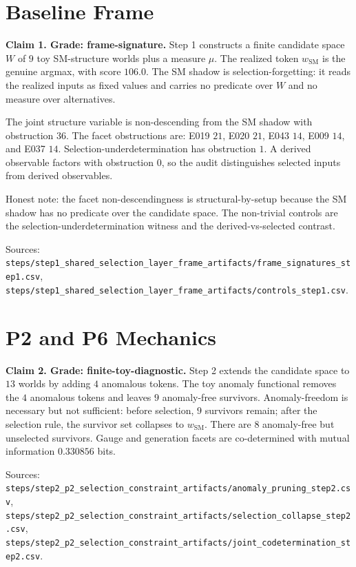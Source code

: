 \documentclass[11pt]{article}
\begin{document}
\section{Baseline Frame}

\textbf{Claim 1. Grade: frame-signature.}
Step 1 constructs a finite candidate space \(W\) of \(9\) toy SM-structure worlds plus a measure \(\mu\). The realized token \(w_{\mathrm{SM}}\) is the genuine argmax, with score \(106.0\). The SM shadow is selection-forgetting: it reads the realized inputs as fixed values and carries no predicate over \(W\) and no measure over alternatives.

The joint structure variable is non-descending from the SM shadow with obstruction \(36\). The facet obstructions are: E019 \(21\), E020 \(21\), E043 \(14\), E009 \(14\), and E037 \(14\). Selection-underdetermination has obstruction \(1\). A derived observable factors with obstruction \(0\), so the audit distinguishes selected inputs from derived observables.

Honest note: the facet non-descendingness is structural-by-setup because the SM shadow has no predicate over the candidate space. The non-trivial controls are the selection-underdetermination witness and the derived-vs-selected contrast.

Sources: \texttt{steps/step1\_shared\_selection\_layer\_frame\_artifacts/frame\_signatures\_step1.csv}, \texttt{steps/step1\_shared\_selection\_layer\_frame\_artifacts/controls\_step1.csv}.

\section{P2 and P6 Mechanics}

\textbf{Claim 2. Grade: finite-toy-diagnostic.}
Step 2 extends the candidate space to \(13\) worlds by adding \(4\) anomalous tokens. The toy anomaly functional removes the \(4\) anomalous tokens and leaves \(9\) anomaly-free survivors. Anomaly-freedom is necessary but not sufficient: before selection, \(9\) survivors remain; after the selection rule, the survivor set collapses to \(w_{\mathrm{SM}}\). There are \(8\) anomaly-free but unselected survivors. Gauge and generation facets are co-determined with mutual information \(0.330856\) bits.

Sources: \texttt{steps/step2\_p2\_selection\_constraint\_artifacts/anomaly\_pruning\_step2.csv}, \texttt{steps/step2\_p2\_selection\_constraint\_artifacts/selection\_collapse\_step2.csv}, \texttt{steps/step2\_p2\_selection\_constraint\_artifacts/joint\_codetermination\_step2.csv}.
\end{document}
